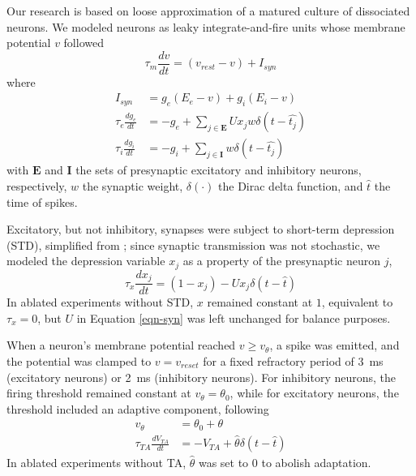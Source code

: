 \documentclass[pdflatex,referee,iicol,sn-basic]{sn-jnl}
\theoremstyle{thmstyleone}%
\theoremstyle{thmstyletwo}%
\theoremstyle{thmstylethree}%
\begin{document}
Our research is based on loose approximation of a matured culture of dissociated neurons. We modeled neurons as leaky integrate-and-fire units whose membrane potential $v$ followed
\begin{equation}
    \tau_m \frac{dv}{dt} = (v_{rest}-v) + I_{syn}
\end{equation}
where
\begin{align}
    I_{syn} &= g_e(E_e-v) + g_i(E_i-v) \nonumber \\
    \tau_e \frac{dg_e}{dt} &= -g_e + \sum_{j \in \boldsymbol E} U x_j w \delta(t - \hat{t_j}) \nonumber \\
    \tau_i \frac{dg_i}{dt} &= -g_i + \sum_{j \in \boldsymbol I} w \delta(t - \hat{t_j}) \label{eqn-syn}
\end{align}
with $\boldsymbol E$ and $\boldsymbol I$ the sets of presynaptic excitatory and inhibitory neurons, respectively, $w$ the synaptic weight, $\delta(\cdot)$ the Dirac delta function, and $\hat{t}$ the time of spikes.

Excitatory, but not inhibitory, synapses were subject to short-term depression (STD), simplified from \cite{Tsodyks1997-qt}; since synaptic transmission was not stochastic, we modeled the depression variable $x_j$ as a property of the presynaptic neuron $j$,
\begin{equation}
    \tau_x \frac{dx_j}{dt} = (1-x_j) - U x_j \delta(t - \hat{t})
\end{equation}
In ablated experiments without STD, $x$ remained constant at $1$, equivalent to $\tau_x = 0$, but $U$ in Equation \ref{eqn-syn} was left unchanged for balance purposes.

When a neuron's membrane potential reached $v \geq v_\theta$, a spike was emitted, and the potential was clamped to $v = v_{reset}$ for a fixed refractory period of 3~ms (excitatory neurons) or 2~ms (inhibitory neurons). For inhibitory neurons, the firing threshold remained constant at $v_\theta = \theta_0$, while for excitatory neurons, the threshold included an adaptive component, following
\begin{align}
    v_\theta &= \theta_0 + \theta \nonumber \\
    \tau_{TA} \frac{dV_{TA}}{dt} &= -V_{TA} + \hat{\theta} \delta(t - \hat{t})
\end{align}
In ablated experiments without TA, $\hat{\theta}$ was set to $0$ to abolish adaptation.
\end{document}
